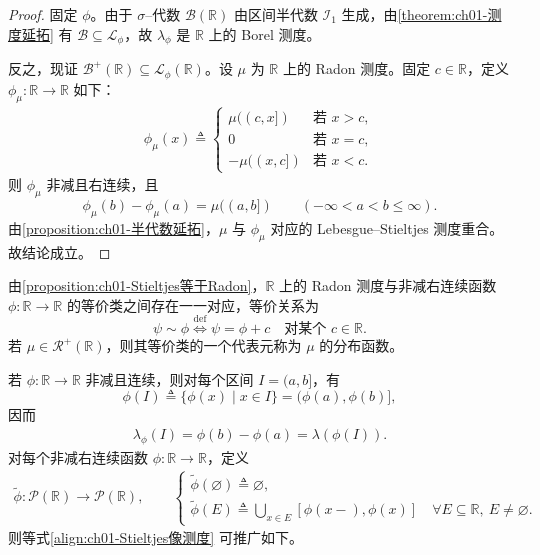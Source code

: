 \documentclass[../../main.tex]{subfiles}%
\begin{document}
\begin{proof}
固定 $\phi$。由于 $\sigma$--代数 $\mathcal{B}(\mathbb{R})$ 由区间半代数 $\mathcal{I}_1$ 生成，由\cref{theorem:ch01-测度延拓} 有 $\mathcal{B}\subseteq\mathcal{L}_\phi$，故 $\lambda_\phi$ 是 $\mathbb{R}$ 上的 Borel 测度。

反之，现证 $\mathcal{B}^+(\mathbb{R})\subseteq\mathcal{L}_\phi(\mathbb{R})$。设 $\mu$ 为 $\mathbb{R}$ 上的 Radon 测度。固定 $c\in\mathbb{R}$，定义 $\phi_\mu:\mathbb{R}\to\mathbb{R}$ 如下：
\begin{align}
\phi_\mu(x)\triangleq 
\begin{cases}
\mu((c,x]) & \text{若 }x>c,\\
0 & \text{若 }x=c,\\
-\mu((x,c]) & \text{若 }x<c.
\end{cases} \label{align:ch01-分布函数}
\end{align}
则 $\phi_\mu$ 非减且右连续，且
\[
\phi_\mu(b)-\phi_\mu(a)=\mu((a,b])\qquad(-\infty<a<b\leqslant\infty).
\]
由\cref{proposition:ch01-半代数延拓}，$\mu$ 与 $\phi_\mu$ 对应的 Lebesgue--Stieltjes 测度重合。故结论成立。
\end{proof}

\begin{remark}\label{remark:ch01-分布函数}
由\cref{proposition:ch01-Stieltjes等于Radon}，$\mathbb{R}$ 上的 Radon 测度与非减右连续函数 $\phi:\mathbb{R}\to\mathbb{R}$ 的等价类之间存在一一对应，等价关系为
\[
\psi\sim\phi\overset{\mathrm{def}}{\Longleftrightarrow}\psi=\phi+c\quad\text{对某个 }c\in\mathbb{R}.
\]
若 $\mu\in\mathcal{R}^+(\mathbb{R})$，则其等价类的一个代表元称为 $\mu$ 的分布函数。

若 $\phi:\mathbb{R}\to\mathbb{R}$ 非减且连续，则对每个区间 $I=(a,b]$，有
\[
\phi(I)\triangleq \{\phi(x)\mid x\in I\}=(\phi(a),\phi(b)],
\]
因而
\begin{align}
\lambda_\phi(I)=\phi(b)-\phi(a)=\lambda(\phi(I)). \label{align:ch01-Stieltjes像测度}
\end{align}
对每个非减右连续函数 $\phi:\mathbb{R}\to\mathbb{R}$，定义
\begin{align}
\widetilde{\phi}:\mathcal{P}(\mathbb{R})\to\mathcal{P}(\mathbb{R}),\qquad
\begin{cases}
\widetilde{\phi}(\varnothing )\triangleq \varnothing ,\\
\widetilde{\phi}(E)\triangleq \bigcup_{x\in E}[\phi(x-),\phi(x)]\quad\forall E\subseteq\mathbb{R},\ E\neq\varnothing .
\end{cases} \label{align:ch01-像映射}
\end{align}
则等式\eqref{align:ch01-Stieltjes像测度} 可推广如下。
\end{remark}
\end{document}
